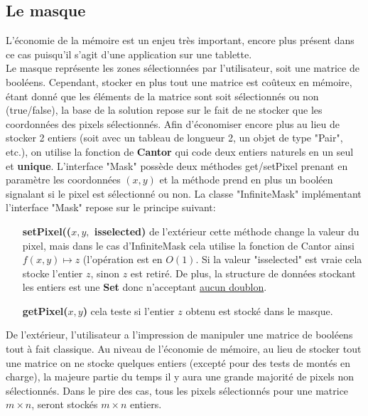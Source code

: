 \subsection{Le masque}
L'économie de la mémoire est un enjeu très important, encore plus présent dans ce cas
puisqu'il s'agit d'une application sur une tablette.\\
Le masque représente les zones sélectionnées
par l'utilisateur, soit une matrice de booléens. Cependant, stocker en plus tout une matrice est coûteux en mémoire,
étant donné que les éléments de la matrice sont soit sélectionnés ou non \\
(true/false), la base de la solution repose sur le fait de ne stocker que les
\\coordonnées des pixels sélectionnés. Afin d'économiser encore plus au lieu de stocker 2 entiers (soit avec un tableau de longueur 2,
un objet de type "Pair", etc.), on utilise la fonction de \textbf{Cantor} qui code deux entiers naturels en un seul et \textbf{unique}.
L'interface "Mask" possède deux méthodes get/setPixel prenant en paramètre les coordonnées $(x,y)$ et la méthode prend en plus un booléen\\
signalant si le pixel est sélectionné ou non.
La classe "InfiniteMask" implémentant l'interface "Mask" repose sur le principe suivant:
\vspace{0.2cm}

\begin{itemize}
\item[\textbf{setPixel(($x,y,$ isselected)}] de l'extérieur cette méthode change la valeur du pixel, mais dans le cas d'InfiniteMask
cela utilise la fonction de Cantor ainsi $f(x,y)  \mapsto z$ (l'opération est en $ O(1)$. Si la valeur "isselected" est vraie cela stocke l'entier $z$, sinon
$z$ est retiré. De plus, la structure de données stockant les entiers est une \textbf{Set} donc n'acceptant \underline{aucun doublon}.
\vspace*{0.2cm}
\item[\textbf{getPixel($x,y$)}] cela teste si l'entier $z$ obtenu est stocké dans le masque.
\end{itemize}

\newpage
De l'extérieur, l'utilisateur a l'impression de manipuler une matrice de booléens tout à fait classique.
Au niveau de l'économie de mémoire, au lieu de stocker tout une matrice on ne stocke quelques entiers
(excepté pour des tests de montés en charge), la majeure partie du temps il y aura une grande majorité de pixels non sélectionnés.
Dans le pire des cas, tous les pixels sélectionnés pour une matrice $m\times n$, seront stockés $m\times n$ entiers.
